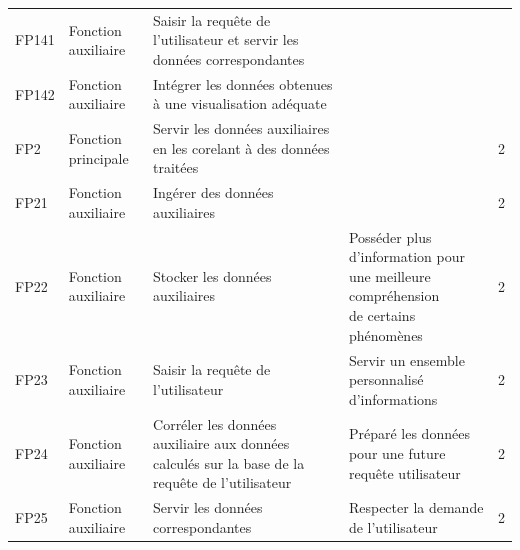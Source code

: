 \documentclass[a4paper]{article}
\begin{document}
\begin{longtable}{|p{1cm}|p{3cm}|p{6cm}|p{5.5cm}|p{30px}|}
	\rowcolor{lineb}
	FP141             & Fonction auxiliaire & Saisir la requête de l'utilisateur et servir les données correspondantes                        & \cellcolor{white}                                                                                 & \cellcolor{white}       \\\cline{1-3}
	FP142             & Fonction auxiliaire & Intégrer les données obtenues à une visualisation adéquate                                      &                                                                                                   &                         \\\cline{1-3}\cline{5-5}
	\rowcolor{lineb}
	FP2               & Fonction principale & Servir les données auxiliaires en les corelant à des données traitées                           & \cellcolor{white}                                                                                 & 2                       \\\hline
	FP21              & Fonction auxiliaire & Ingérer des données auxiliaires                                                                 & \cellcolor{lineb}                                                                                 & 2                       \\\cline{1-3}
	\rowcolor{lineb}
	FP22              & Fonction auxiliaire & Stocker les données auxiliaires                                                                 & \makecell[l]{Posséder plus d'information pour                                                                               \\une meilleure compréhension\\de certains phénomènes\cellcolor{lineb}} & 2 \\\hline
	FP23              & Fonction auxiliaire & Saisir la requête de l'utilisateur                                                              & Servir un ensemble personnalisé d'informations                                                    & 2                       \\\hline
	\rowcolor{lineb}
	FP24              & Fonction auxiliaire & Corréler les données auxiliaire aux données calculés sur la base de la requête de l'utilisateur & Préparé les données pour une future requête utilisateur                                           & 2                       \\\hline
	FP25              & Fonction auxiliaire & Servir les données correspondantes                                                              & Respecter la demande de l'utilisateur                                                             & 2                       \\\hline

\end{longtable}
\end{document}
